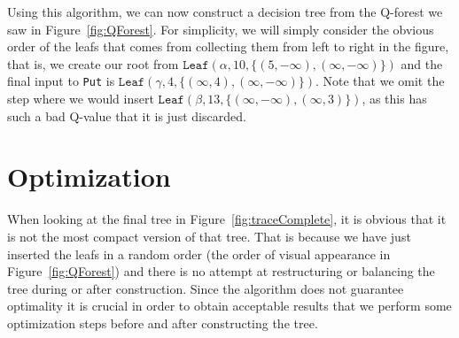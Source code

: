 \documentclass{article}
\begin{document}
Using this algorithm, we can now construct a decision tree from the Q-forest we
saw in Figure~\ref{fig:QForest}. For simplicity, we will simply consider the
obvious order of the leafs that comes from collecting them from left to right in
the figure, that is, we create our root from $\texttt{Leaf}(\alpha, 10, \{
(5, -\infty), (\infty, -\infty) \})$ and the final input to \texttt{Put} is
$\texttt{Leaf}(\gamma, 4, \{ (\infty, 4), (\infty, -\infty) \})$. Note that we
omit the step where we would insert $\texttt{Leaf}(\beta, 13, \{ (\infty,
-\infty), (\infty, 3) \})$, as this has such a bad Q-value that it is just
discarded.

    
\section{Optimization}

When looking at the final tree in Figure~\ref{fig:traceComplete}, it is obvious
that it is not the most compact version of that tree. That is because we have
just inserted the leafs in a random order (the order of visual appearance in
Figure~\ref{fig:QForest}) and there is no attempt at restructuring or balancing
the tree during or after construction. Since the algorithm does not guarantee
optimality it is crucial in order to obtain acceptable results that we perform
some optimization steps before and after constructing the tree.
\end{document}
